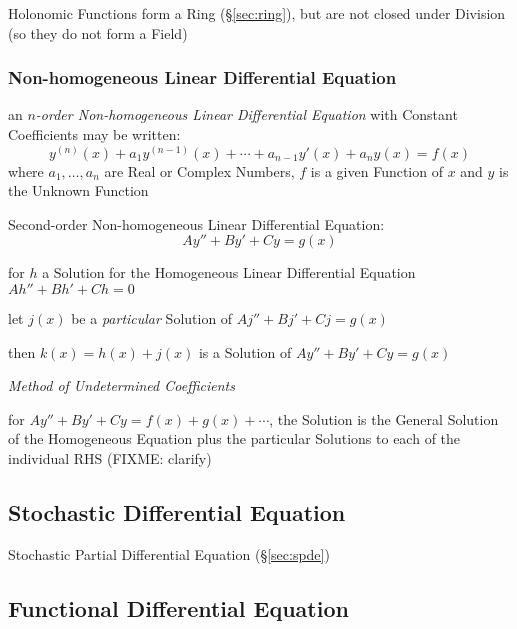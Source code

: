 Holonomic Functions form a Ring (\S\ref{sec:ring}), but are not closed under
Division (so they do not form a Field)



\subsubsection{Non-homogeneous Linear Differential Equation}
\label{sec:nonhomogeneous_linear_differential}

an \emph{$n$-order Non-homogeneous Linear Differential Equation} with Constant
Coefficients may be written:
\[
  y^{(n)}(x) + a_1y^{(n-1)}(x) + \cdots + a_{n-1}y'(x) + a_ny(x) = f(x)
\]
where $a_1,\ldots,a_n$ are Real or Complex Numbers, $f$ is a given Function of
$x$ and $y$ is the Unknown Function

Second-order Non-homogeneous Linear Differential Equation:
\[
  A y'' + B y' + C y = g(x)
\]

for $h$ a Solution for the Homogeneous Linear Differential Equation $Ah'' + Bh'
+ Ch = 0$

let $j(x)$ be a \emph{particular} Solution of $Aj'' + Bj' + Cj = g(x)$

then $k(x) = h(x) + j(x)$ is a Solution of $A y'' + B y' + C y = g(x)$

\emph{Method of Undetermined Coefficients}

for $A y'' + B y' + C y = f(x) + g(x) + \cdots$, the Solution is the General
Solution of the Homogeneous Equation plus the particular Solutions to each of
the individual RHS (FIXME: clarify)



\subsection{Stochastic Differential Equation}\label{sec:sde}

\fist Stochastic Partial Differential Equation (\S\ref{sec:spde})



\subsection{Functional Differential Equation}\label{sec:fde}

